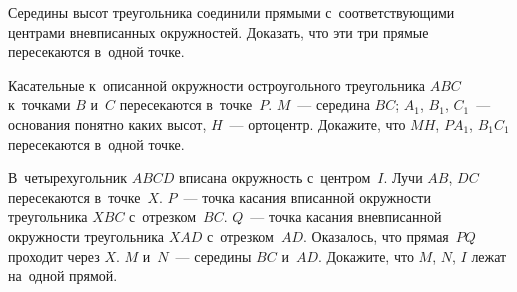 \begin{problems}
\item
Середины высот треугольника соединили прямыми с~соответствующими центрами
вневписанных окружностей.
Доказать, что эти три прямые пересекаются в~одной точке.

\item
Касательные к~описанной окружности остроугольного треугольника $ABC$ к~точками
$B$ и~$C$ пересекаются в~точке~$P$.
$M$~--- середина $BC$;
$A_1$, $B_1$, $C_1$~--- основания понятно каких высот, $H$~--- ортоцентр.
Докажите, что $MH$, $P A_1$, $B_1 C_1$ пересекаются в~одной точке.

\item
В~четырехугольник $ABCD$ вписана окружность с~центром~$I$.
Лучи $AB$, $DC$ пересекаются в~точке~$X$.
$P$~--- точка касания вписанной окружности треугольника $XBC$ с~отрезком~$BC$.
$Q$~--- точка касания вневписанной окружности треугольника $XAD$
с~отрезком~$AD$.
Оказалось, что прямая~$PQ$ проходит через $X$.
$M$ и~$N$~--- середины $BC$ и~$AD$.
Докажите, что $M$, $N$, $I$ лежат на~одной прямой.

\end{problems}

